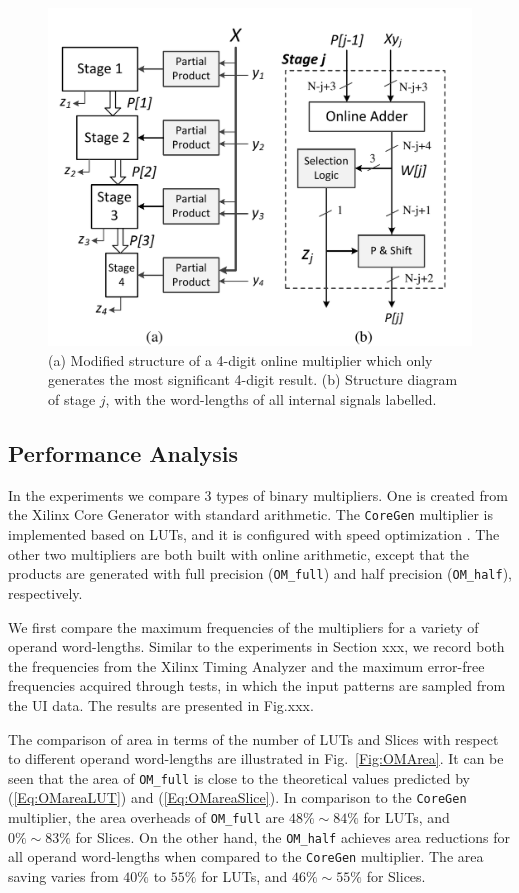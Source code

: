 \documentclass[conference]{IEEEtran}
\begin{document}
\begin{figure}[tbp]
	\centering
	\includegraphics[width=.5\textwidth]{./Figures/ParallelMult_MSDhalf.pdf}
	\caption{(a) Modified structure of a 4-digit online multiplier which only generates the most significant 4-digit result. (b) Structure diagram of stage $j$, with the word-lengths of all internal signals labelled.}
	\label{Fig:PMStructure_MSDhalf}
\end{figure}

\subsection{Performance Analysis}
In the experiments we compare 3 types of binary multipliers. One is created from the Xilinx Core Generator with standard arithmetic. The \texttt{CoreGen} multiplier is implemented based on LUTs, and it is configured with speed optimization \cite{XilinxMult} . The other two multipliers are both built with online arithmetic, except that the products are generated with full precision (\texttt{OM\_full}) and half precision (\texttt{OM\_half}), respectively.

We first compare the maximum frequencies of the multipliers for a variety of operand word-lengths. Similar to the experiments in Section xxx, we record both the frequencies from the Xilinx Timing Analyzer and the maximum error-free frequencies acquired through tests, in which the input patterns are sampled from the UI data. The results are presented in Fig.xxx.



The comparison of area in terms of the number of LUTs and Slices with respect to different operand word-lengths are illustrated in Fig.~\ref{Fig:OMArea}. It can be seen that the area of \texttt{OM\_full} is close to the theoretical values predicted by (\ref{Eq:OMareaLUT}) and (\ref{Eq:OMareaSlice}). In comparison to the \texttt{CoreGen} multiplier, the area overheads of \texttt{OM\_full} are $48\%\sim84\%$ for LUTs, and $0\%\sim83\%$ for Slices. On the other hand, the \texttt{OM\_half} achieves area reductions for all operand word-lengths when compared to the \texttt{CoreGen} multiplier. The area saving varies from $40\%$ to $55\%$ for LUTs, and $46\%\sim55\%$ for Slices.
\end{document}
